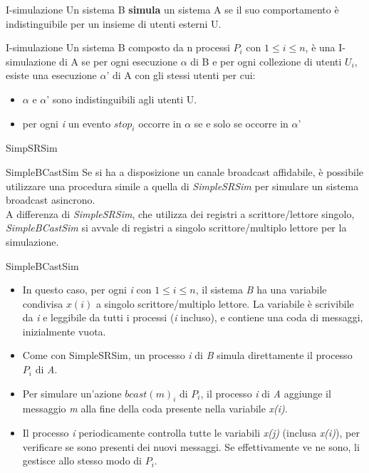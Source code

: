 \documentclass{beamer}
\begin{document}
\begin{frame}{I-simulazione}
    Un sistema B \textbf{simula} un sistema A se il suo comportamento è indistinguibile per un insieme di utenti esterni U.
    
    \begin{block}{I-simulazione}
        Un sistema B composto da n processi $P_{i}$ con $1 \leq i \leq n$, è una I-simulazione di A se per ogni esecuzione $\alpha$ di B e per ogni collezione di utenti $U_{i}$, esiste una esecuzione $\alpha$' di A con gli stessi utenti per cui:
        \begin{itemize}
            \item $\alpha$ e $\alpha$' sono indistinguibili agli utenti U. %
            \item per ogni \textit{i} un evento $stop_{i}$ occorre in $\alpha$ se e solo se occorre in $\alpha$'
        \end{itemize}
    \end{block}
    
\end{frame}

\begin{frame}{SimpSRSim}

\end{frame}

\begin{frame}{SimpleBCastSim}
    Se si ha a disposizione un canale broadcast affidabile, è possibile utilizzare una procedura simile a quella di \textit{SimpleSRSim} per simulare un sistema broadcast asincrono.
    \\[10pt]
    A differenza di \textit{SimpleSRSim}, che utilizza dei registri a scrittore/lettore singolo, \textit{SimpleBCastSim} si avvale di registri a singolo scrittore/multiplo lettore per la simulazione.
\end{frame}

\begin{frame}{SimpleBCastSim}
    \begin{itemize}[<+->]
        \item In questo caso, per ogni \textit{i} con $1 \leq i \leq n$, il sistema \textit{B} ha una variabile condivisa $x(i)$ a singolo scrittore/multiplo lettore. 
        \newline La variabile è scrivibile da \textit{i} e leggibile da tutti i processi (\textit{i} incluso), e contiene una coda di messaggi, inizialmente vuota.
        \item Come con SimpleSRSim, un processo \textit{i} di \textit{B} simula direttamente il processo $P_{i}$ di \textit{A}.
        \item Per simulare un'azione $bcast(m)_{i}$ di $P_{i}$, il processo \textit{i} di \textit{A} aggiunge il messaggio \textit{m} alla fine della coda presente nella variabile \textit{x(i)}.
        \item Il processo \textit{i} periodicamente controlla tutte le variabili \textit{x(j)} (inclusa \textit{x(i)}), per verificare se sono presenti dei nuovi messaggi. Se effettivamente ve ne sono, li gestisce allo stesso modo di $P_{i}$.
    \end{itemize}
\end{frame}
\end{document}
